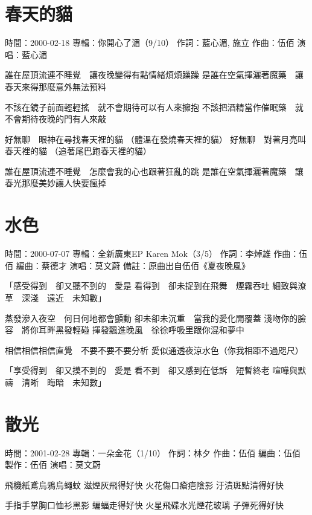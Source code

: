 \documentclass[UTF8,a4paper,oneside,twocolumn,12pt]{ctexbook}
\newcommand{\infopair}[2]{\textbullet #1：#2}
\newcommand{\zc}[1][伍佰]{\infopair{作詞}{#1}}
\newcommand{\zq}[1][伍佰]{\infopair{作曲}{#1}}
\newcommand{\bq}[1][伍佰]{\infopair{編曲}{#1}}
\newcommand{\zj}[1]{\infopair{專輯}{#1}}
\newcommand{\zz}[1]{\infopair{製作}{#1}}
\newcommand{\sj}[1]{\infopair{時間}{#1}}
\newcommand{\bz}[1]{\infopair{備註}{#1}}
\newenvironment{info}{\begin{flushleft}\kaishu
	}
	{\end{flushleft}\normalsize\yahei\par}
\newenvironment{lyric}{
	}
{}
\begin{document}
\section{春天的貓}
\begin{info}
	\sj{2000-02-18}
	\zj{你開心了湄（9/10）}
	\zc[藍心湄, 施立]
	\zq
	\infopair{演唱}{藍心湄}
\end{info}
\begin{lyric}
	誰在屋頂流連不睡覺　讓夜晚變得有點情緒煩煩躁躁
	是誰在空氣揮灑著魔藥　讓春天來得那麼意外無法預料

	不該在鏡子前面輕輕搖　就不會期待可以有人來擁抱
	不該把酒精當作催眠藥　就不會期待夜晚的門有人來敲

	好無聊　眼神在尋找春天裡的貓 （體溫在發燒春天裡的貓）
	好無聊　對著月亮叫春天裡的貓 （追著尾巴跑春天裡的貓）

	誰在屋頂流連不睡覺　怎麼會我的心也跟著狂亂的跳
	是誰在空氣揮灑著魔藥　讓春光那麼美妙讓人快要瘋掉
\end{lyric}

\section{水色}
\begin{info}
	\sj{2000-07-07}%
	\zj{全新廣東EP Karen Mok（3/5）}
	\zc[李焯雄]
	\zq
	\bq[蔡德才]
	\infopair{演唱}{莫文蔚}
	\bz{原曲出自伍佰《夏夜晚風》}
\end{info}
\begin{lyric}
	「感受得到　卻又聽不到的　愛是
	看得到　卻未捉到在飛舞　煙霧吞吐
	細致與潦草　深淺　遠近　未知數」

	蒸發滲入夜空　何日何地都會顫動
	卻未卻未沉重　當我的愛化開覆蓋
	淺吻你的臉容　將你耳畔黑發輕碰
	揮發飄進晚風　徐徐呼吸里跟你混和夢中

	相信相信相信直覺　不要不要不要分析
	愛似通透夜涼水色（你我相距不過咫尺）

	「享受得到　卻又摸不到的　愛是
	看不到　卻又感到在低訴　短暫終老
	喧嘩與默禱　清晰　晦暗　未知數」
\end{lyric}

\section{散光}
\begin{info}
	\sj{2001-02-28}
	\zj{一朵金花（1/10）}
	\zc[林夕]
	\zq
	\bq[伍佰]
	\zz{伍佰}
	\infopair{演唱}{莫文蔚}
\end{info}
\begin{lyric}
	飛機紙鳶烏鴉烏蠅蚊 滋煙灰飛得好快
	火花傷口瘡疤陰影 汙漬斑點清得好快

	手指手掌胸口恤衫黑影 蝙蝠走得好快
	火星飛碟水光煙花玻璃 子彈死得好快
\end{lyric}
\end{document}
